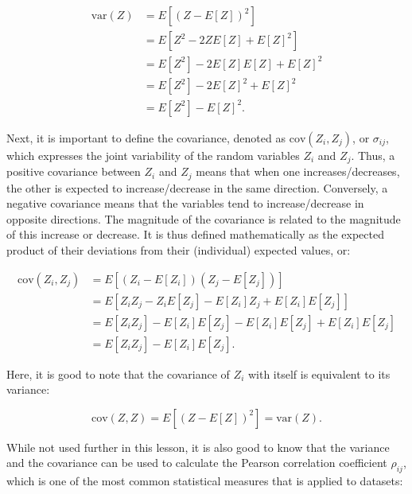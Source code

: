 \begin{align}
\mathrm{var}(Z) &= E\left[{\left(Z-E\left[Z\right]\right)}^2\right] \label{eq:variance1} \\
&= E\left[Z^2 -2ZE\left[Z\right] + E[Z]^2\right] \nonumber \\
&= E\left[Z^2\right] - 2E\left[Z\right]E\left[Z\right] + E\left[Z\right]^2 \nonumber \\
&= E\left[Z^2\right] - 2E\left[Z\right]^2 + E\left[Z\right]^2 \nonumber \\
&= E\left[Z^2\right]-{E[Z]}^2. \label{eq:variance2}
\end{align}

Next, it is important to define the covariance, denoted as \(\mathrm{cov}(Z_i,Z_j)\), or \(\sigma_{ij}\), which expresses the joint variability of the random variables \(Z_i\) and \(Z_j\).
Thus, a positive covariance between \(Z_i\) and \(Z_j\) means that when one increases/decreases, the other is expected to increase/decrease in the same direction.
Conversely, a negative covariance means that the variables tend to increase/decrease in opposite directions.
The magnitude of the covariance is related to the magnitude of this increase or decrease.
It is thus defined mathematically as the expected product of their deviations from their (individual) expected values, or:

\begin{align}
\mathrm{cov}(Z_i, Z_j) &= E\left[\left(Z_i-E[Z_i]\right) \left(Z_j-E[Z_j]\right)\right] \label{eq:covariance} \\
&= E\left[Z_iZ_j - Z_iE\left[Z_j\right] - E\left[Z_i\right]Z_j + E\left[Z_i\right]E\left[Z_j\right]\right] \nonumber \\
&= E\left[Z_iZ_j\right] - E\left[Z_i\right]E\left[Z_j\right] - E\left[Z_i\right]E\left[Z_j\right] + E\left[Z_i\right]E\left[Z_j\right] \nonumber \\
&= E\left[Z_iZ_j\right] - E\left[Z_i\right]E\left[Z_j\right]. \label{eq:covariance2}
\end{align}

Here, it is good to note that the covariance of \(Z_i\) with itself is equivalent to its variance:

\begin{equation}
\mathrm{cov}(Z,Z) = E\left[\left(Z-E[Z]\right)^2\right] = \mathrm{var}(Z). \nonumber
\end{equation}

While not used further in this lesson, it is also good to know that the variance and the covariance can be used to calculate the Pearson correlation coefficient \(\rho_{ij}\), which is one of the most common statistical measures that is applied to datasets:

